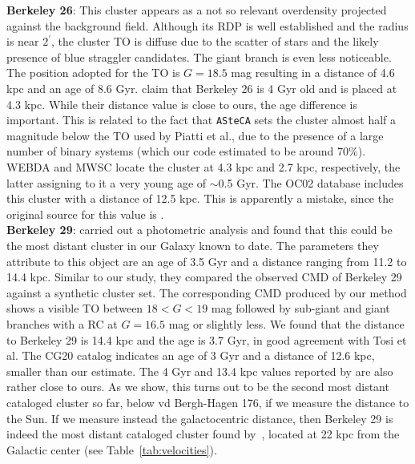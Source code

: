 \documentclass{aa}
\begin{document}
\begin{appendix}
  \noindent \textbf{Berkeley 26}: This cluster appears as a not so relevant overdensity
  projected against the background field. Although its RDP is well established
  and the radius is near $2^{\prime}$, the cluster TO is diffuse due to the
  scatter of stars and the likely presence of  blue straggler candidates. The
  giant branch is even less noticeable.
  The position adopted for the TO is $G=18.5$ mag resulting in a distance of 4.6
  kpc and an age of 8.6 Gyr. \cite{Piatti_2010} claim that Berkeley 26 is 4 Gyr
  old and is placed at 4.3 kpc. While their distance value is close to ours, the
  age difference is important. This is related to the fact that \texttt{ASteCA}
  sets the cluster almost half a magnitude below the TO used by Piatti et al.,
  due to the presence of a large number of binary systems (which our code
  estimated to be around 70\%).
  WEBDA and MWSC locate the cluster at 4.3 kpc and 2.7 kpc, respectively, the
  latter assigning to it a very young age of $\sim$0.5 Gyr. The OC02 database
  includes this cluster with a distance of 12.5 kpc. This is apparently
  a mistake, since the original source for this value is \cite{Piatti_2010}.\\

  \noindent \textbf{Berkeley 29}: \cite{Tosi_2004} carried out a photometric analysis
  and found that this could be the most distant cluster in our Galaxy known to date.
  The parameters they attribute to this object are an age of 3.5 Gyr and a
  distance ranging from 11.2 to 14.4 kpc.
  Similar to our study, they compared the observed CMD of Berkeley 29 against a
  synthetic cluster set. The corresponding CMD produced by our method
  shows a visible TO between $18<G<19$ mag followed by  sub-giant and giant
  branches with a RC at $G=16.5$ mag or slightly less. We found that the
  distance to Berkeley 29 is 14.4 kpc and the age is 3.7 Gyr, in good
  agreement with Tosi et al. The CG20 catalog indicates an age of 3 Gyr and a
  distance of 12.6 kpc, smaller than our estimate. The 4 Gyr and 13.4
  kpc values reported by \cite{Frinchaboy_2006} are also rather close to ours.
  As we show, this turns out to be the second most
  distant cataloged cluster so far, below vd Bergh-Hagen 176, if we measure
  the distance to the Sun. If we measure instead the galactocentric distance,
  then Berkeley 29 is indeed the most distant cataloged cluster  found
  by~\cite{Tosi_2004}, located at 22 kpc from the Galactic center (see
  Table~\ref{tab:velocities}).\\


\end{appendix}
\end{document}
